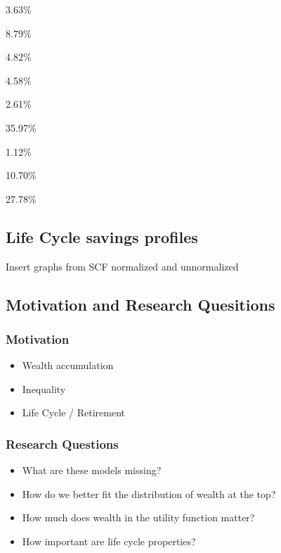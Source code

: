 \documentclass[
  letterpaper,
  DIV=11,
  numbers=noendperiod]{scrartcl}
\providecommand{\tightlist}{%
  \setlength{\itemsep}{0pt}\setlength{\parskip}{0pt}}\usepackage{longtable,booktabs,array}
\begin{document}
3.63\%

8.79\%

4.82\%

4.58\%

2.61\%

35.97\%

1.12\%

10.70\%

27.78\%

\subsection{Life Cycle savings
profiles}\label{life-cycle-savings-profiles}

Insert graphs from SCF normalized and unnormalized

\subsection{Motivation and Research
Quesitions}\label{motivation-and-research-quesitions}

\subsubsection{Motivation}\label{motivation}

\begin{itemize}
\tightlist
\item
  Wealth accumulation
\item
  Inequality
\item
  Life Cycle / Retirement
\end{itemize}

\subsubsection{Research Questions}\label{research-questions}

\begin{itemize}
\tightlist
\item
  What are these models missing?
\item
  How do we better fit the distribution of wealth at the top?
\item
  How much does wealth in the utility function matter?
\item
  How important are life cycle properties?
\end{itemize}
\end{document}
